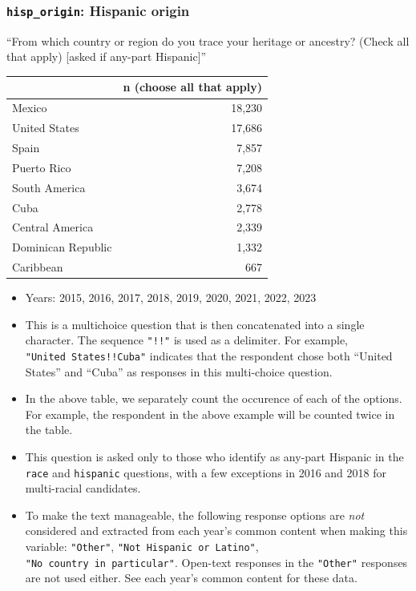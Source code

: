 \documentclass[10pt,article,oneside]{memoir}
\theoremstyle{definition}
\begin{document}
\subsubsection{\texorpdfstring{\texttt{hisp\_origin}: Hispanic
origin}{hisp\_origin: Hispanic origin}}\label{hisp_origin-hispanic-origin}

``From which country or region do you trace your heritage or ancestry?
(Check all that apply) {[}asked if any-part Hispanic{]}''

\begin{table}[H]
\centering
\begin{tabular}[t]{lr}
\toprule
 & n (choose all that apply)\\
\midrule
Mexico & 18,230\\
United States & 17,686\\
Spain & 7,857\\
Puerto Rico & 7,208\\
South America & 3,674\\
Cuba & 2,778\\
Central America & 2,339\\
Dominican Republic & 1,332\\
Caribbean & 667\\
\bottomrule
\end{tabular}
\end{table}

\begin{itemize}
\tightlist
\item
  Years: 2015, 2016, 2017, 2018, 2019, 2020, 2021, 2022, 2023
\item
  This is a multichoice question that is then concatenated into a single
  character. The sequence \texttt{"!!"} is used as a delimiter. For
  example, \texttt{"United\ States!!Cuba"} indicates that the respondent
  chose both ``United States'' and ``Cuba'' as responses in this
  multi-choice question.
\item
  In the above table, we separately count the occurence of each of the
  options. For example, the respondent in the above example will be
  counted twice in the table.
\item
  This question is asked only to those who identify as any-part Hispanic
  in the \texttt{race} and \texttt{hispanic} questions, with a few
  exceptions in 2016 and 2018 for multi-racial candidates.
\item
  To make the text manageable, the following response options are
  \emph{not} considered and extracted from each year's common content
  when making this variable: \texttt{"Other"},
  \texttt{"Not\ Hispanic\ or\ Latino"},
  \texttt{"No\ country\ in\ particular"}. Open-text responses in the
  \texttt{"Other"} responses are not used either. See each year's common
  content for these data.
\end{itemize}
\end{document}
